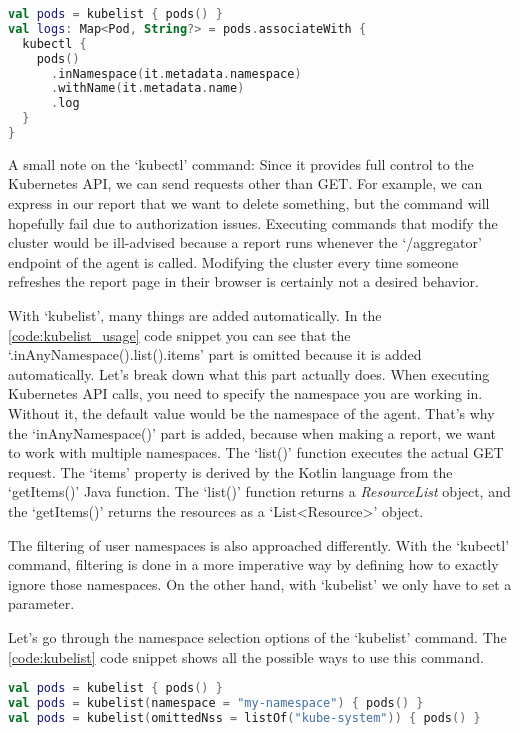 \begin{lstlisting}[caption={Download pod logs},language=Kotlin,label=code:get_logs]
val pods = kubelist { pods() }
val logs: Map<Pod, String?> = pods.associateWith {
  kubectl {
    pods()
      .inNamespace(it.metadata.namespace)
      .withName(it.metadata.name)
      .log
  }
}
\end{lstlisting}

A small note on the `kubectl' command: Since it provides full control to the Kubernetes API, we can send requests other than GET. For example, we can express in our report that we want to delete something, but the command will hopefully fail due to authorization issues. Executing commands that modify the cluster would be ill-advised because a report runs whenever the `/aggregator' endpoint of the agent is called. Modifying the cluster every time someone refreshes the report page in their browser is certainly not a desired behavior.

With `kubelist', many things are added automatically. In the \ref{code:kubelist_usage} code snippet you can see that the `.inAnyNamespace().list().items' part is omitted because it is added automatically. Let's break down what this part actually does. When executing Kubernetes API calls, you need to specify the namespace you are working in. Without it, the default value would be the namespace of the agent. That's why the `inAnyNamespace()' part is added, because when making a report, we want to work with multiple namespaces. The `list()' function executes the actual GET request. The `items' property is derived by the Kotlin language from the `getItems()' Java function. The `list()' function returns a \emph{ResourceList} object, and the `getItems()' returns the resources as a `List<Resource>' object.

The filtering of user namespaces is also approached differently. With the `kubectl' command, filtering is done in a more imperative way by defining how to exactly ignore those namespaces. On the other hand, with `kubelist' we only have to set a parameter.

Let's go through the namespace selection options of the `kubelist' command. The \ref{code:kubelist} code snippet shows all the possible ways to use this command.

\begin{lstlisting}[caption={Usages of kubelist},language=Kotlin,label=code:kubelist]
val pods = kubelist { pods() }
val pods = kubelist(namespace = "my-namespace") { pods() }
val pods = kubelist(omittedNss = listOf("kube-system")) { pods() }
\end{lstlisting}

